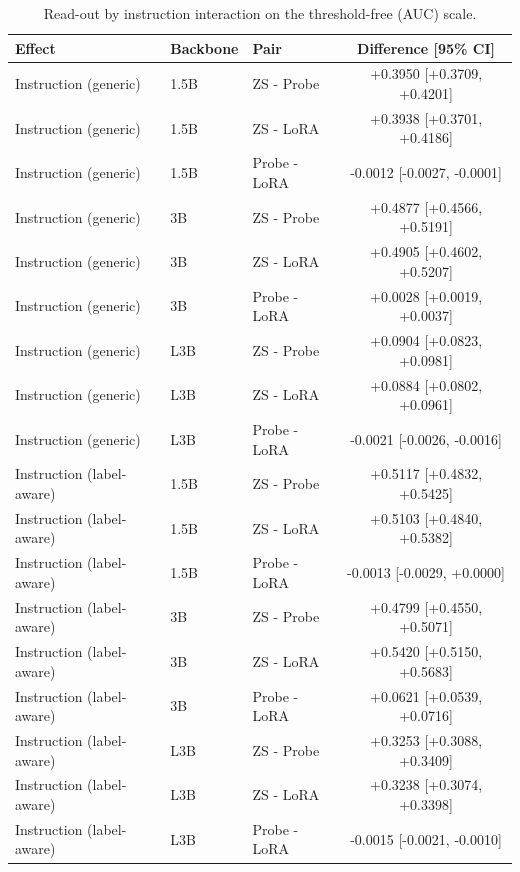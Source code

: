 \begin{table}[t]
\centering
\caption{Read-out by instruction interaction on the threshold-free (AUC) scale.}
\label{tab:aucdid}
\footnotesize
\begin{tabular}{lllc}
\toprule
\textbf{Effect} & \textbf{Backbone} & \textbf{Pair} & \textbf{Difference [95\% CI]} \\
\midrule
Instruction (generic) & 1.5B & ZS - Probe & +0.3950 [+0.3709, +0.4201] \\
Instruction (generic) & 1.5B & ZS - LoRA & +0.3938 [+0.3701, +0.4186] \\
Instruction (generic) & 1.5B & Probe - LoRA & -0.0012 [-0.0027, -0.0001] \\
Instruction (generic) & 3B & ZS - Probe & +0.4877 [+0.4566, +0.5191] \\
Instruction (generic) & 3B & ZS - LoRA & +0.4905 [+0.4602, +0.5207] \\
Instruction (generic) & 3B & Probe - LoRA & +0.0028 [+0.0019, +0.0037] \\
Instruction (generic) & L3B & ZS - Probe & +0.0904 [+0.0823, +0.0981] \\
Instruction (generic) & L3B & ZS - LoRA & +0.0884 [+0.0802, +0.0961] \\
Instruction (generic) & L3B & Probe - LoRA & -0.0021 [-0.0026, -0.0016] \\
Instruction (label-aware) & 1.5B & ZS - Probe & +0.5117 [+0.4832, +0.5425] \\
Instruction (label-aware) & 1.5B & ZS - LoRA & +0.5103 [+0.4840, +0.5382] \\
Instruction (label-aware) & 1.5B & Probe - LoRA & -0.0013 [-0.0029, +0.0000] \\
Instruction (label-aware) & 3B & ZS - Probe & +0.4799 [+0.4550, +0.5071] \\
Instruction (label-aware) & 3B & ZS - LoRA & +0.5420 [+0.5150, +0.5683] \\
Instruction (label-aware) & 3B & Probe - LoRA & +0.0621 [+0.0539, +0.0716] \\
Instruction (label-aware) & L3B & ZS - Probe & +0.3253 [+0.3088, +0.3409] \\
Instruction (label-aware) & L3B & ZS - LoRA & +0.3238 [+0.3074, +0.3398] \\
Instruction (label-aware) & L3B & Probe - LoRA & -0.0015 [-0.0021, -0.0010] \\
\bottomrule
\end{tabular}
\end{table}